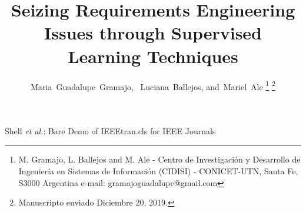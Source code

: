 \documentclass[journal]{IEEEtran}
\begin{document}
%
\title{Seizing Requirements Engineering Issues through Supervised Learning Techniques }
%
%
%

\author{Maria~Guadalupe~Gramajo,~
    Luciana~Ballejos, and~Mariel~Ale%
\thanks{M. Gramajo, L. Ballejos and M. Ale - Centro de Investigaci\'on y Desarrollo de Ingenier\'ia en Sistemas de Informaci\'on (CIDISI) - CONICET-UTN, Santa Fe, S3000 Argentina   e-mail: gramajoguadalupe@gmail.com }
\thanks{Manuscripto enviado Diciembre 20, 2019.}}

% 
%



%
{Shell \MakeLowercase{\textit{et al.}}: Bare Demo of IEEEtran.cls for IEEE Journals}
% 
\end{document}
